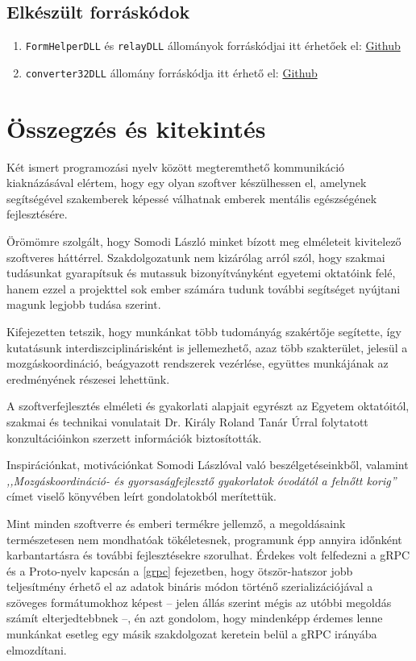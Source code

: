 \documentclass[tocnopagenum]{thesis-ekf}
\begin{document}
	\subsection{Elkészült forráskódok}
	\begin{enumerate}
		\item \verb*|FormHelperDLL| és \verb*|relayDLL| állományok forráskódjai itt érhetőek el: \hyperref{https://github.com/nagytoth1/dzkbx0_thesis_repo}{}{}{Github}
		\item \verb*|converter32DLL| állomány forráskódja itt érhető el: \hyperref{https://github.com/nagytoth1/jsonConverterC/}{}{}{Github}
	\end{enumerate}
	
	\section{Összegzés és kitekintés}
	Két ismert programozási nyelv között megteremthető kommunikáció kiaknázásával elértem, hogy egy olyan szoftver készülhessen el, amelynek segítségével szakemberek képessé válhatnak emberek mentális egészségének fejlesztésére. 
	
	Örömömre szolgált, hogy Somodi László minket bízott meg elméleteit kivitelező szoftveres háttérrel. Szakdolgozatunk nem kizárólag arról szól, hogy szakmai tudásunkat gyarapítsuk és mutassuk bizonyítványként egyetemi oktatóink felé, hanem ezzel a projekttel sok ember számára tudunk további segítséget nyújtani magunk legjobb tudása szerint.
	
	Kifejezetten tetszik, hogy munkánkat több tudományág szakértője segítette, így kutatásunk interdiszciplinárisként is jellemezhető, azaz több szakterület, jelesül a mozgáskoordináció, beágyazott rendszerek vezérlése, együttes munkájának az eredményének részesei lehettünk.
	
	A szoftverfejlesztés elméleti és gyakorlati alapjait egyrészt az Egyetem oktatóitól, szakmai és technikai vonulatait Dr. Király Roland Tanár Úrral folytatott konzultációinkon szerzett információk biztosították. 
	
	Inspirációnkat, motivációnkat Somodi Lászlóval való beszélgetéseinkből, valamint \textit{,,Mozgáskoordináció- és gyorsaságfejlesztő gyakorlatok óvodától a felnőtt korig''} címet viselő könyvében leírt gondolatokból merítettük.
	
	Mint minden szoftverre és emberi termékre jellemző, a megoldásaink természetesen nem mondhatóak tökéletesnek, programunk épp annyira időnként karbantartásra és további fejlesztésekre szorulhat. Érdekes volt felfedezni a gRPC és a Proto-nyelv kapcsán a \ref{grpc} fejezetben, hogy ötször-hatszor jobb teljesítmény érhető el az adatok bináris módon történő szerializációjával a szöveges formátumokhoz képest -- jelen állás szerint mégis az utóbbi megoldás számít elterjedtebbnek --, én azt gondolom, hogy mindenképp érdemes lenne munkánkat esetleg egy másik szakdolgozat keretein belül a gRPC irányába elmozdítani.
\end{document}
